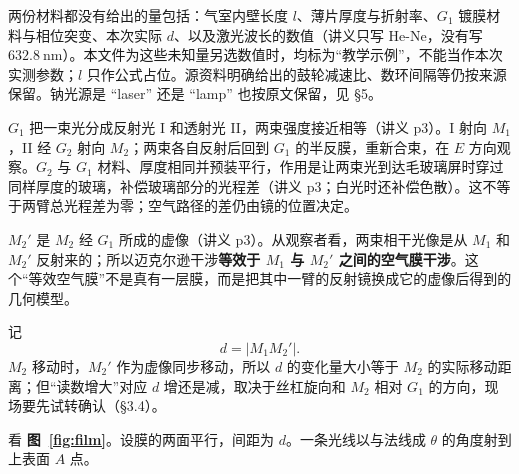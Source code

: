 \documentclass[11pt]{ctexart}
\begin{document}

两份材料都没有给出的量包括：气室内壁长度 \(l\)、薄片厚度与折射率、\(G_1\) 镀膜材料与相位突变、本次实际 \(d\)、以及激光波长的数值（讲义只写 He-Ne，没有写 \(632.8\ \mathrm{nm}\)）。本文件为这些未知量另选数值时，均标为“教学示例”，不能当作本次实测参数；\(l\) 只作公式占位。源资料明确给出的鼓轮减速比、数环间隔等仍按来源保留。钠光源是 “laser” 还是 “lamp” 也按原文保留，见 §5。



\(G_1\) 把一束光分成反射光 I 和透射光 II，两束强度接近相等（讲义 p3）。I 射向 \(M_1\)，II 经 \(G_2\) 射向 \(M_2\)；两束各自反射后回到 \(G_1\) 的半反膜，重新合束，在 \(E\) 方向观察。\(G_2\) 与 \(G_1\) 材料、厚度相同并预装平行，作用是让两束光到达毛玻璃屏时穿过同样厚度的玻璃，补偿玻璃部分的光程差（讲义 p3；白光时还补偿色散）。这不等于两臂总光程差为零；空气路径的差仍由镜的位置决定。

\(M_2'\) 是 \(M_2\) 经 \(G_1\) 所成的虚像（讲义 p3）。从观察者看，两束相干光像是从 \(M_1\) 和 \(M_2'\) 反射来的；所以迈克尔逊干涉\textbf{等效于 \(M_1\) 与 \(M_2'\) 之间的空气膜干涉}。这个“等效空气膜”不是真有一层膜，而是把其中一臂的反射镜换成它的虚像后得到的几何模型。

记
\[
d=|M_1M_2'| .
\]
\(M_2\) 移动时，\(M_2'\) 作为虚像同步移动，所以 \(d\) 的变化量大小等于 \(M_2\) 的实际移动距离；但“读数增大”对应 \(d\) 增还是减，取决于丝杠旋向和 \(M_2\) 相对 \(G_1\) 的方向，现场要先试转确认（§3.4）。



看 \textbf{图~\ref{fig:film}}。设膜的两面平行，间距为 \(d\)。一条光线以与法线成 \(\theta\) 的角度射到上表面 \(A\) 点。
\end{document}

